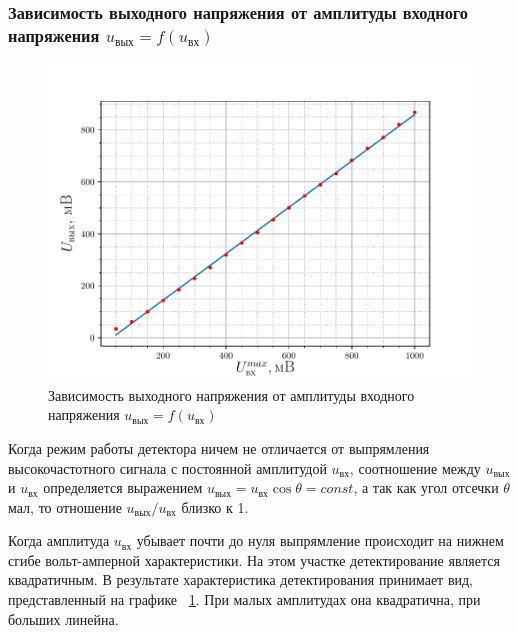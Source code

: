 \subsubsection{Зависимость выходного напряжения от амплитуды входного напряжения $u_\text{вых}=f(u_\text{вх})$}
\begin{figure}[h!]
	\centering
	\includegraphics[width=0.8\linewidth]{fig/exp3a.pdf}
	\caption{Зависимость выходного напряжения от амплитуды входного напряжения $u_\text{вых}=f(u_\text{вх})$}
	\label{exp:3.2}
\end{figure}

Когда режим работы детектора ничем не отличается от выпрямления высокочастотного сигнала с постоянной амплитудой $u_\text{вх}$, соотношение между $u_\text{вых}$ и $u_\text{вх}$ определяется выражением $u_\text{вых}=u_\text{вх}\cos\theta=const$, а так как угол отсечки $\theta$ мал, то отношение $u_\text{вых}/u_\text{вх}$ близко к 1.

Когда амплитуда $u_\text{вх}$ убывает почти до нуля выпрямление происходит на нижнем сгибе вольт-амперной характеристики. На этом участке детектирование является квадратичным. В результате характеристика детектирования принимает вид, представленный на графике ~\ref{exp:3.2}. При малых амплитудах она квадратична, при больших линейна.  
